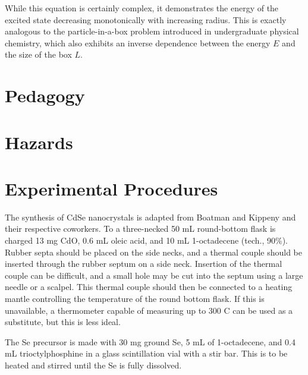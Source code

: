 \documentclass[journal = jceda8, manuscript = article]{achemso}
\begin{document}
While this equation is certainly complex, it demonstrates the energy of the
excited state decreasing monotonically with increasing radius. This is exactly
analogous to the particle-in-a-box problem introduced in undergraduate physical
chemistry, which also exhibits an inverse dependence between the energy $E$ and
the size of the box $L$.

\section{Pedagogy}


\section{Hazards}


\section{Experimental Procedures}


The synthesis of CdSe nanocrystals is adapted from Boatman and Kippeny and their
respective coworkers. \cite{jce-1, jce-2} To a three-necked 50 mL round-bottom
flask is charged 13 mg CdO, 0.6 mL oleic acid, and 10 mL 1-octadecene (tech.,
90\%). Rubber septa should be placed on the side necks, and a thermal couple
should be inserted through the rubber septum on a side neck. Insertion of the
thermal couple can be difficult, and a small hole may be cut into the septum
using a large needle or a scalpel. This thermal couple should then be connected
to a heating mantle controlling the temperature of the round bottom flask.  If
this is unavailable, a thermometer capable of measuring up to 300 \degree C can
be used as a substitute, but this is less ideal.

The Se precursor is made with 30 mg ground Se, 5 mL of 1-octadecene, and
0.4 mL trioctylphosphine in a glass scintillation vial with a stir bar. This is
to be heated and stirred until the Se is fully dissolved.
\end{document}
